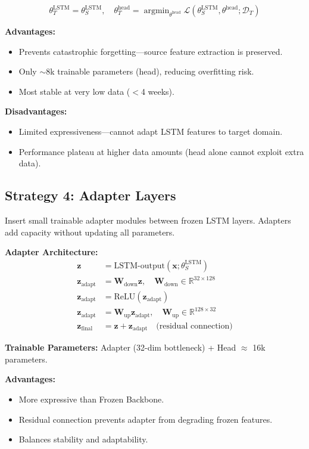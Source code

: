 \documentclass[12pt,a4paper]{report}
\newcommand{\R}{\mathbb{R}}
\newcommand{\argmin}{\operatorname{argmin}}
\begin{document}
\[
\theta_T^{\text{LSTM}} = \theta_S^{\text{LSTM}}, \quad \theta_T^{\text{head}} = \argmin_{\theta^{\text{head}}} \mathcal{L}(\theta_S^{\text{LSTM}}, \theta^{\text{head}}; \mathcal{D}_T)
\]

\textbf{Advantages:}
\begin{itemize}
    \item Prevents catastrophic forgetting—source feature extraction is preserved.
    \item Only $\sim$8k trainable parameters (head), reducing overfitting risk.
    \item Most stable at very low data ($<$4 weeks).
\end{itemize}

\textbf{Disadvantages:}
\begin{itemize}
    \item Limited expressiveness—cannot adapt LSTM features to target domain.
    \item Performance plateau at higher data amounts (head alone cannot exploit extra data).
\end{itemize}

\subsection{Strategy 4: Adapter Layers}

Insert small trainable adapter modules between frozen LSTM layers. Adapters add capacity without updating all parameters.

\textbf{Adapter Architecture:}
\begin{align}
\mathbf{z} &= \text{LSTM-output}(\mathbf{x}; \theta_S^{\text{LSTM}}) \\
\mathbf{z}_{\text{adapt}} &= \mathbf{W}_{\text{down}} \mathbf{z}, \quad \mathbf{W}_{\text{down}} \in \R^{32 \times 128} \\
\mathbf{z}_{\text{adapt}} &= \text{ReLU}(\mathbf{z}_{\text{adapt}}) \\
\mathbf{z}_{\text{adapt}} &= \mathbf{W}_{\text{up}} \mathbf{z}_{\text{adapt}}, \quad \mathbf{W}_{\text{up}} \in \R^{128 \times 32} \\
\mathbf{z}_{\text{final}} &= \mathbf{z} + \mathbf{z}_{\text{adapt}} \quad \text{(residual connection)}
\end{align}

\textbf{Trainable Parameters:} Adapter (32-dim bottleneck) + Head $\approx$ 16k parameters.

\textbf{Advantages:}
\begin{itemize}
    \item More expressive than Frozen Backbone.
    \item Residual connection prevents adapter from degrading frozen features.
    \item Balances stability and adaptability.
\end{itemize}
\end{document}
